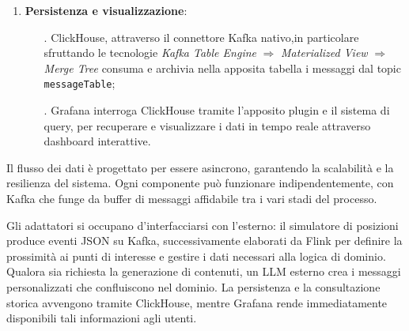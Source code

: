 \documentclass[10pt]{article}
\begin{document}
\begin{enumerate}
        \item \textbf{Persistenza e visualizzazione}:
        \begin{itemize}
            \item[.] ClickHouse, attraverso il connettore Kafka nativo,in particolare sfruttando le tecnologie \textit{Kafka Table Engine} $\Rightarrow$ \textit{Materialized View} $\Rightarrow$ \textit{Merge Tree} consuma e archivia nella apposita tabella i messaggi dal topic \texttt{messageTable};
            \item[.] Grafana interroga ClickHouse tramite l'apposito plugin e il sistema di query, per recuperare e visualizzare i dati in tempo reale attraverso dashboard interattive.
        \end{itemize}
    \end{enumerate}

    Il flusso dei dati è progettato per essere asincrono, garantendo la scalabilità e la resilienza del sistema. Ogni componente può funzionare indipendentemente, con Kafka che funge da buffer di messaggi affidabile tra i vari stadi del processo.

    Gli adattatori si occupano d'interfacciarsi con l'esterno: il simulatore di posizioni produce eventi JSON su Kafka, successivamente elaborati da Flink per definire la prossimità ai punti di interesse e gestire i dati necessari alla logica di dominio. Qualora sia richiesta la generazione di contenuti, un LLM esterno crea i messaggi personalizzati che confluiscono nel dominio. La persistenza e la consultazione storica avvengono tramite ClickHouse, mentre Grafana rende immediatamente disponibili tali informazioni agli utenti.
\end{document}
